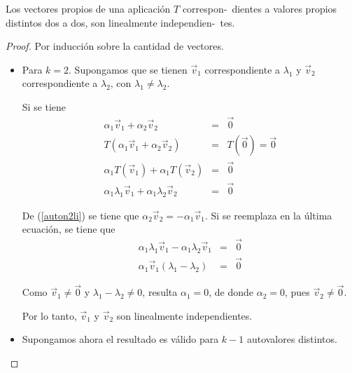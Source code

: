 \begin{theorem}

\label{PROPOSICION4}



Los vectores propios de una aplicación $T$ correspon-\ dientes a valores propios distintos dos a dos, son linealmente independien-\ tes.

\begin{proof}
Por inducción sobre la cantidad de vectores. 
\begin{itemize}
\item

Para $k=2$.
Supongamos que  se tienen $\Vec{v}_1$ correspondiente a $ \lambda_1 $ y $\Vec{v}_2$ correspondiente a $ \lambda_2 $, con $ \lambda_1  \neq \lambda_2 $.  

Si se tiene
\begin{eqnarray}
\label{auton2li}
 \alpha_1 \Vec{v}_1 + \alpha_2 \Vec{v}_2 &= &\Vec{0} \\
 T(\alpha_1 \Vec{v}_1 + \alpha_2 \Vec{v}_2 )&=&T( \Vec{0})=\Vec{0} \nonumber\\
\alpha_1 T(\Vec{v}_1) + \alpha_1 T(\Vec{v}_2 )&=&\Vec{0} \nonumber\\
\alpha_1 \lambda_1\Vec{v}_1 + \alpha_1 \lambda_2\Vec{v}_2 &=&\Vec{0} \nonumber
\end{eqnarray}

\bigskip

 De (\ref{auton2li}) se tiene que  $  \alpha_2 \Vec{v}_2 = - \alpha_1 \Vec{v}_1$. Si se reemplaza en la última ecuación, se tiene que
\begin{eqnarray}
 \alpha_1 \lambda_1\Vec{v}_1 - \alpha_1 \lambda_2 \Vec{v}_1 &=&\Vec{0} \nonumber\\
 \alpha_1 \Vec{v}_1( \lambda_1 - \lambda_2) &=&\Vec{0} 
 \end{eqnarray}


\bigskip 

 Como $\Vec{v}_1 \neq \Vec{0}$ y $ \lambda_1 - \lambda_2 \neq  0$, resulta  $ \alpha_1=0$, de donde  $ \alpha_2=0$, pues
 $\Vec{v}_2 \neq \Vec{0}$.

 \bigskip 
 
 Por lo tanto, $\Vec{v}_1$ y $\Vec{v}_2$ son linealmente independientes.


  \bigskip 
  
\item

Supongamos ahora el resultado es válido para $k-1$ autovalores distintos.


\end{itemize}
\end{proof}
\end{theorem}
